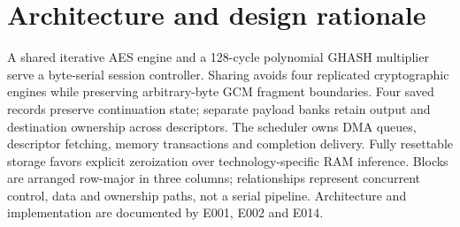 \documentclass[11pt,a4paper]{article}
\begin{document}
\section{Architecture and design rationale}

A shared iterative AES engine and a 128-cycle polynomial GHASH multiplier serve a byte-serial session controller. Sharing avoids four replicated cryptographic engines while preserving arbitrary-byte GCM fragment boundaries. Four saved records preserve continuation state; separate payload banks retain output and destination ownership across descriptors. The scheduler owns DMA queues,\allowbreak{} descriptor fetching,\allowbreak{} memory transactions and completion delivery. Fully resettable storage favors explicit zeroization over technology-specific RAM inference. Blocks are arranged row-major in three columns; relationships represent concurrent control,\allowbreak{} data and ownership paths,\allowbreak{} not a serial pipeline. Architecture and implementation are documented by E001,\allowbreak{} E002 and E014.
\end{document}
